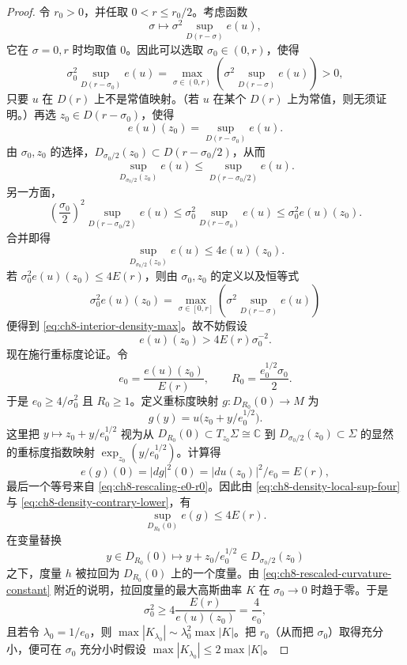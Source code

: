 \begin{proof}
令 $r_0>0$，并任取 $0<r\leq r_0/2$。考虑函数
\[
 \sigma\longmapsto \sigma^2\sup_{D(r-\sigma)}e(u),
\]
它在 $\sigma=0,r$ 时均取值 $0$。因此可以选取 $\sigma_0\in(0,r)$，使得
\[
 \sigma_0^2\sup_{D(r-\sigma_0)}e(u)
 =\max_{\sigma\in(0,r)}\left(\sigma^2\sup_{D(r-\sigma)}e(u)\right)>0,
\]
只要 $u$ 在 $D(r)$ 上不是常值映射。（若 $u$ 在某个 $D(r)$ 上为常值，则无须证明。）再选 $z_0\in D(r-\sigma_0)$，使得
\[
 e(u)(z_0)=\sup_{D(r-\sigma_0)}e(u).
\]
由 $\sigma_0,z_0$ 的选择，$D_{\sigma_0/2}(z_0)\subset D(r-\sigma_0/2)$，从而
\[
 \sup_{D_{\sigma_0/2}(z_0)}e(u)\leq
 \sup_{D(r-\sigma_0/2)}e(u).
\]
另一方面，
\[
 \left(\frac{\sigma_0}{2}\right)^2
 \sup_{D(r-\sigma_0/2)}e(u)
 \leq \sigma_0^2\sup_{D(r-\sigma_0)}e(u)
 \leq\sigma_0^2e(u)(z_0).
\]
合并即得
\begin{equation}
 \sup_{D_{\sigma_0/2}(z_0)}e(u)\leq4e(u)(z_0).
 \label{eq:ch8-density-local-sup-four}
\end{equation}
若 $\sigma_0^2e(u)(z_0)\leq4E(r)$，则由 $\sigma_0,z_0$ 的定义以及恒等式
\[
 \sigma_0^2e(u)(z_0)=
 \max_{\sigma\in[0,r]}\left(\sigma^2\sup_{D(r-\sigma)}e(u)\right)
\]
便得到 \eqref{eq:ch8-interior-density-max}。故不妨假设
\begin{equation}
 e(u)(z_0)>4E(r)\sigma_0^{-2}.
 \label{eq:ch8-density-contrary-lower}
\end{equation}
现在施行重标度论证。令
\begin{equation}
 e_0=\frac{e(u)(z_0)}{E(r)},\qquad
 R_0=\frac{e_0^{1/2}\sigma_0}{2}.
 \label{eq:ch8-rescaling-e0-r0}
\end{equation}
于是 $e_0\geq4/\sigma_0^2$ 且 $R_0\geq1$。定义重标度映射
$g:D_{R_0}(0)\to M$ 为
\[
 g(y)=u\bigl(z_0+y/e_0^{1/2}\bigr).
\]
这里把 $y\mapsto z_0+y/e_0^{1/2}$ 视为从
$D_{R_0}(0)\subset T_{z_0}\Sigma\cong\mathbb C$ 到
$D_{\sigma_0/2}(z_0)\subset\Sigma$ 的显然的重标度指数映射
$\exp_{z_0}(y/e_0^{1/2})$。计算得
\[
 e(g)(0)=|dg|^2(0)=|du(z_0)|^2/e_0=E(r),
\]
最后一个等号来自 \eqref{eq:ch8-rescaling-e0-r0}。因此由
\eqref{eq:ch8-density-local-sup-four} 与
\eqref{eq:ch8-density-contrary-lower}，有
\[
 \sup_{D_{R_0}(0)}e(g)\leq4E(r).
\]
在变量替换
\[
 y\in D_{R_0}(0)\longmapsto y+z_0/e_0^{1/2}\in D_{\sigma_0/2}(z_0)
\]
之下，度量 $h$ 被拉回为 $D_{R_0}(0)$ 上的一个度量。由
\eqref{eq:ch8-rescaled-curvature-constant} 附近的说明，拉回度量的最大高斯曲率 $K$ 在 $\sigma_0\to0$ 时趋于零。于是
\[
 \sigma_0^2\geq4\frac{E(r)}{e(u)(z_0)}=\frac4{e_0},
\]
且若令 $\lambda_0=1/e_0$，则
$\max|K_{\lambda_0}|\sim\lambda_0^2\max|K|$。把 $r_0$（从而把 $\sigma_0$）取得充分小，便可在 $\sigma_0$ 充分小时假设
$\max|K_{\lambda_0}|\leq2\max|K|$。


\end{proof}
